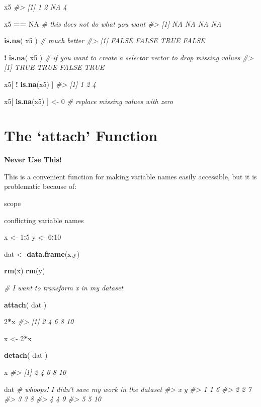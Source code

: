 \documentclass[]{book}
\newenvironment{Shaded}{\begin{snugshade}}{\end{snugshade}}
\newcommand{\CommentTok}[1]{\textcolor[rgb]{0.56,0.35,0.01}{\textit{#1}}}
\newcommand{\DecValTok}[1]{\textcolor[rgb]{0.00,0.00,0.81}{#1}}
\newcommand{\KeywordTok}[1]{\textcolor[rgb]{0.13,0.29,0.53}{\textbf{#1}}}
\newcommand{\NormalTok}[1]{#1}
\newcommand{\OperatorTok}[1]{\textcolor[rgb]{0.81,0.36,0.00}{\textbf{#1}}}
\newcommand{\OtherTok}[1]{\textcolor[rgb]{0.56,0.35,0.01}{#1}}
\newcommand{\StringTok}[1]{\textcolor[rgb]{0.31,0.60,0.02}{#1}}
\theoremstyle{definition}
\theoremstyle{definition}
\theoremstyle{definition}
\theoremstyle{remark}
\begin{document}
\begin{Shaded}
\begin{Highlighting}[]

\NormalTok{x5}
\CommentTok{#> [1]  1  2 NA  4}

\NormalTok{x5 }\OperatorTok{==}\StringTok{ }\OtherTok{NA}    \CommentTok{# this does not do what you want}
\CommentTok{#> [1] NA NA NA NA}

\KeywordTok{is.na}\NormalTok{( x5 )    }\CommentTok{# much better}
\CommentTok{#> [1] FALSE FALSE  TRUE FALSE}

\OperatorTok{!}\StringTok{ }\KeywordTok{is.na}\NormalTok{( x5 )  }\CommentTok{# if you want to create a selector vector to drop missing values }
\CommentTok{#> [1]  TRUE  TRUE FALSE  TRUE}

\NormalTok{x5[ }\OperatorTok{!}\StringTok{ }\KeywordTok{is.na}\NormalTok{(x5) ]}
\CommentTok{#> [1] 1 2 4}

\NormalTok{x5[ }\KeywordTok{is.na}\NormalTok{(x5) ] <-}\StringTok{ }\DecValTok{0}  \CommentTok{# replace missing values with zero}
\end{Highlighting}
\end{Shaded}

\hypertarget{the-attach-function}{%
\section{The `attach' Function}\label{the-attach-function}}

\textbf{Never Use This!}

This is a convenient function for making variable names easily
accessible, but it is problematic because of:

scope

conflicting variable names

\begin{Shaded}
\begin{Highlighting}[]

\NormalTok{x <-}\StringTok{ }\DecValTok{1}\OperatorTok{:}\DecValTok{5}
\NormalTok{y <-}\StringTok{ }\DecValTok{6}\OperatorTok{:}\DecValTok{10}

\NormalTok{dat <-}\StringTok{ }\KeywordTok{data.frame}\NormalTok{(x,y)}

\KeywordTok{rm}\NormalTok{(x)}
\KeywordTok{rm}\NormalTok{(y)}


\CommentTok{# I want to transform x in my dataset}

\KeywordTok{attach}\NormalTok{( dat )}

\DecValTok{2}\OperatorTok{*}\NormalTok{x}
\CommentTok{#> [1]  2  4  6  8 10}

\NormalTok{x <-}\StringTok{ }\DecValTok{2}\OperatorTok{*}\NormalTok{x}

\KeywordTok{detach}\NormalTok{( dat )}

\NormalTok{x}
\CommentTok{#> [1]  2  4  6  8 10}

\NormalTok{dat  }\CommentTok{# whoops! I didn't save my work in the dataset}
\CommentTok{#>   x  y}
\CommentTok{#> 1 1  6}
\CommentTok{#> 2 2  7}
\CommentTok{#> 3 3  8}
\CommentTok{#> 4 4  9}
\CommentTok{#> 5 5 10}
\end{Highlighting}
\end{Shaded}
\end{document}
